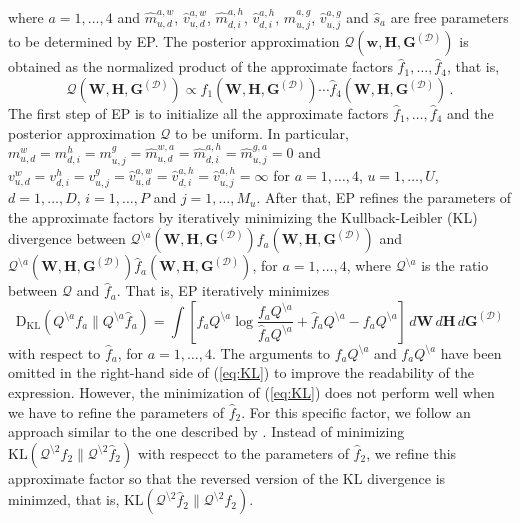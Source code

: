 where $a=1,\ldots,4$ and $\hat{m}_{u,d}^{a,w}$, $\hat{v}_{u,d}^{a,w}$, $\hat{m}_{d,i}^{a,h}$, $\hat{v}_{d,i}^{a,h}$,
$\hat{m}_{u,j}^{a,g}$, $\hat{v}_{u,j}^{a,g}$ and $\hat{s}_a$ are free parameters to be determined by EP. 
The posterior approximation $\mathcal{Q}(\mathbf{w},\mathbf{H},\mathbf{G}^{(\mathcal{D})})$
is obtained as the normalized product of the approximate factors $\hat{f}_{1},\ldots,\hat{f}_{4}$, that is,
\begin{equation}
\mathcal{Q}(\mathbf{W},\mathbf{H},\mathbf{G}^{(\mathcal{D})}) \propto
\hat{f}_{1}(\mathbf{W},\mathbf{H},\mathbf{G}^{(\mathcal{D})})\cdots\hat{f}_{4}(\mathbf{W},\mathbf{H},\mathbf{G}^{(\mathcal{D})})\,.
\end{equation}
The first step of EP is to initialize all the approximate factors $\hat{f}_1,\ldots,\hat{f}_4$ and the posterior approximation $\mathcal{Q}$ to be uniform.
In particular,
$m_{u,d}^w=m_{d,i}^h=m_{u,j}^g=\hat{m}_{u,d}^{w,a}=\hat{m}_{d,i}^{a,h}=\hat{m}_{u,j}^{g,a}=0$ and 
$v_{u,d}^w = v_{d,i}^h = v_{u,j}^g = \hat{v}_{u,d}^{a,w} = \hat{v}_{d,i}^{a,h} = \hat{v}_{u,j}^{a,h} = \infty$ for
$a=1,\ldots,4$, $u=1,\ldots,U$, $d=1,\ldots,D$, $i=1,\ldots,P$ and $j = 1,\ldots,M_u$.
After that, EP refines the parameters of the approximate factors by iteratively minimizing the Kullback-Leibler (KL) divergence
between $\mathcal{Q}^{\setminus a}(\mathbf{W},\mathbf{H},\mathbf{G}^{(\mathcal{D})})f_a(\mathbf{W},\mathbf{H},\mathbf{G}^{(\mathcal{D})})$
and $\mathcal{Q}^{\setminus a}(\mathbf{W},\mathbf{H},\mathbf{G}^{(\mathcal{D})})\hat{f}_a(\mathbf{W},\mathbf{H},\mathbf{G}^{(\mathcal{D})})$, for $a=1,\ldots,4$,
where $\mathcal{Q}^{\setminus a}$ is the ratio between $\mathcal{Q}$ and $\hat{f}_a$. That is, EP iteratively minimizes
\begin{equation} 
\text{D}_{\text{KL}}(Q^{\setminus a}f_a\|Q^{\setminus a}\hat{f}_a) 
= \int \left[f_a Q^{\setminus a}\log \frac{f_aQ^{\setminus a}}{\hat{f}_a Q^{\setminus a}}+
\hat{f}_a Q^{\setminus a}-f_a Q^{\setminus a}\right]\,d\mathbf{W}\,d\mathbf{H}\,d\mathbf{G}^{(\mathcal{D})}\label{eq:KL}
\end{equation}
with respect to $\hat{f}_a$, for $a = 1,\ldots,4$.
The arguments to $f_a Q^{\setminus a}$ and 
$f_aQ^{\setminus a}$ have been omitted in the 
right-hand side of (\ref{eq:KL}) to improve the readability of the expression.
However, the minimization of (\ref{eq:KL}) does not perform well when we have to refine the parameters of $\hat{f}_2$. For this specific factor,
we follow an approach similar to the one described by \cite{stern2009}. 
Instead of minimizing $\text{KL}(\mathcal{Q}^{\setminus 2} f_2 \| \mathcal{Q}^{\setminus 2} \hat{f}_2)$ with respecct to the parameters of $\hat{f}_2$,
we refine this approximate factor so that the reversed version of the KL divergence is minimzed, that is,
$\text{KL}(\mathcal{Q}^{\setminus 2} \hat{f}_2 \| \mathcal{Q}^{\setminus 2} f_2)$.

